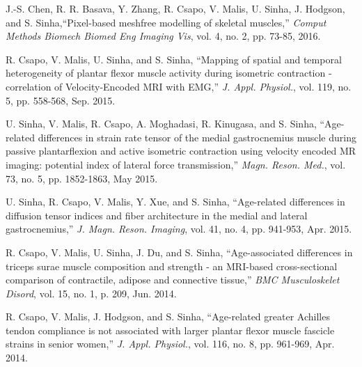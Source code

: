 \begin{frontmatter}
\begin{vitapage}
\begin{publications}
  \item	J.-S. Chen, R. R. Basava, Y. Zhang, R. Csapo, V. Malis, U. Sinha, J. Hodgson, and S. Sinha,``Pixel-based meshfree modelling of skeletal muscles,'' \emph{Comput Methods Biomech Biomed Eng Imaging Vis}, vol. 4, no. 2, pp. 73-85, 2016.
  \item	R. Csapo, V. Malis, U. Sinha, and S. Sinha, ``Mapping of spatial and temporal heterogeneity of plantar flexor muscle activity during isometric contraction - correlation of Velocity-Encoded MRI with EMG,'' \emph{J. Appl. Physiol.}, vol. 119, no. 5, pp. 558-568, Sep. 2015.
  \item U. Sinha, V. Malis, R. Csapo, A. Moghadasi, R. Kinugasa, and S. Sinha, ``Age-related differences in strain rate tensor of the medial gastrocnemius muscle during passive plantarflexion and active isometric contraction using velocity encoded MR imaging: potential index of lateral force transmission,'' \emph{Magn. Reson. Med.}, vol. 73, no. 5, pp. 1852-1863, May 2015.
  \item U. Sinha, R. Csapo, V. Malis, Y. Xue, and S. Sinha, ``Age-related differences in diffusion tensor indices and fiber architecture in the medial and lateral gastrocnemius,'' \emph{J. Magn. Reson. Imaging}, vol. 41, no. 4, pp. 941-953, Apr. 2015.
  \item R. Csapo, V. Malis, U. Sinha, J. Du, and S. Sinha, ``Age-associated differences in triceps surae muscle composition and strength - an MRI-based cross-sectional comparison of contractile, adipose and connective tissue,'' \emph{BMC Musculoskelet Disord}, vol. 15, no. 1, p. 209, Jun. 2014.
  \item R. Csapo, V. Malis, J. Hodgson, and S. Sinha, ``Age-related greater Achilles tendon compliance is not associated with larger plantar flexor muscle fascicle strains in senior women,'' \emph{J. Appl. Physiol.}, vol. 116, no. 8, pp. 961-969, Apr. 2014.
\end{publications}


\end{vitapage}
\end{frontmatter}

